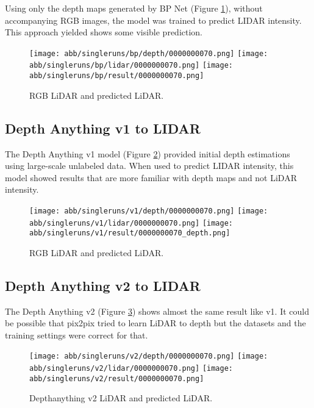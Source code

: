 Using only the depth maps generated by BP Net (Figure \ref{bp_results}), without accompanying RGB images, the model was trained to predict LIDAR intensity. This approach yielded shows some visible prediction.
\begin{figure}[!ht]
	\centering
	\texttt{[image: abb/singleruns/bp/depth/0000000070.png]}
	\texttt{[image: abb/singleruns/bp/lidar/0000000070.png]}
	\texttt{[image: abb/singleruns/bp/result/0000000070.png]}
	\caption{RGB LiDAR and predicted LiDAR.}
	\label{bp_results}
\end{figure}
\newpage
\subsection{Depth Anything v1 to LIDAR}

The Depth Anything v1 model (Figure \ref{v1_results}) provided initial depth estimations using large-scale unlabeled data. When used to predict LIDAR intensity, this model showed results that are more familiar with depth maps and not LiDAR intensity.
\begin{figure}[!ht]
	\centering
	\texttt{[image: abb/singleruns/v1/depth/0000000070.png]}
	\texttt{[image: abb/singleruns/v1/lidar/0000000070.png]}
	\texttt{[image: abb/singleruns/v1/result/0000000070\_depth.png]}
	\caption{RGB LiDAR and predicted LiDAR.}
	\label{v1_results}
\end{figure}
\newpage
\subsection{Depth Anything v2 to LIDAR}

The Depth Anything v2 (Figure \ref{v2_results}) shows almost the same result like v1. It could be possible that pix2pix tried to learn LiDAR to depth but the datasets and the training settings were correct for that.
\begin{figure}[!ht]
	\centering
	\texttt{[image: abb/singleruns/v2/depth/0000000070.png]}
	\texttt{[image: abb/singleruns/v2/lidar/0000000070.png]}
	\texttt{[image: abb/singleruns/v2/result/0000000070.png]}
	\caption{Depthanything v2 LiDAR and predicted LiDAR.}
	\label{v2_results}
\end{figure}
\newpage
